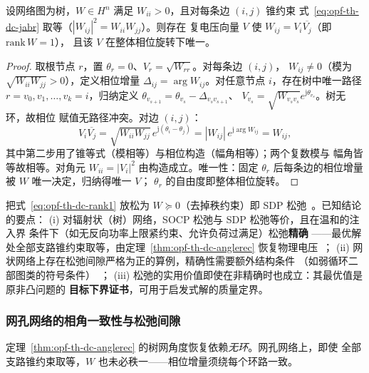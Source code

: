 \begin{theorem}[树网角度恢复]\label{thm:opf-th-dc-anglerec}
设网络图为树，$W\in H^n$ 满足 $W_{ii}>0$，且对每条边 $(i,j)$ 锥约束
式~\eqref{eq:opf-th-dc-jabr} 取等（$|W_{ij}|^2=W_{ii}W_{jj}$）。则存在
复电压向量 $V$ 使 $W_{ij}=V_i\overline{V_j}$（即 $\mathrm{rank}\,W=1$），
且该 $V$ 在整体相位旋转下唯一。
\end{theorem}

\begin{proof}
取根节点 $r$，置 $\theta_r=0$、$V_r=\sqrt{W_{rr}}$。对每条边 $(i,j)$，
$W_{ij}\neq0$（模为 $\sqrt{W_{ii}W_{jj}}>0$），定义相位增量
$\Delta_{ij}=\arg W_{ij}$。对任意节点 $i$，存在树中唯一路径
$r=v_0,v_1,\dots,v_k=i$，归纳定义
$\theta_{v_{s+1}}=\theta_{v_s}-\Delta_{v_s v_{s+1}}$、
$V_{v_s}=\sqrt{W_{v_sv_s}}e^{\mathrm j\theta_{v_s}}$。树无环，故相位
赋值无路径冲突。对边 $(i,j)$：
\begin{equation}
V_i\overline{V_j}=\sqrt{W_{ii}W_{jj}}\,
e^{\mathrm j(\theta_i-\theta_j)}
=|W_{ij}|\,e^{\mathrm j\arg W_{ij}}=W_{ij},
\end{equation}
其中第二步用了锥等式（模相等）与相位构造（幅角相等）；两个复数模与
幅角皆等故相等。对角元 $W_{ii}=|V_i|^2$ 由构造成立。唯一性：固定
$\theta_r$ 后每条边的相位增量被 $W$ 唯一决定，归纳得唯一 $V$；
$\theta_r$ 的自由度即整体相位旋转。
\end{proof}

\begin{remark}\label{rem:opf-th-dc-sdp}
把式~\eqref{eq:opf-th-dc-rank1} 放松为 $W\succeq0$（去掉秩约束）即
SDP 松弛~\cite{opfdc:lavaei-low,opfdc:low-tutorial}。已知结论的要点：
(i) 对辐射状（树）网络，SOCP 松弛与 SDP 松弛等价，且在温和的注入界
条件下（如无反向功率上限紧约束、允许负荷过满足）松弛\textbf{精确}
——最优解处全部支路锥约束取等，由定理~\ref{thm:opf-th-dc-anglerec}
恢复物理电压~\cite{opfdc:farivar-low,opfdc:gan-low}；
(ii) 网状网络上存在松弛间隙严格为正的算例，精确性需要额外结构条件
（如弱循环二部图类的符号条件）~\cite{opfdc:lavaei-low}；
(iii) 松弛的实用价值即使在非精确时也成立：其最优值是原非凸问题的
\textbf{目标下界证书}，可用于启发式解的质量定界。
\end{remark}

\subsubsection{网孔网络的相角一致性与松弛间隙}

定理~\ref{thm:opf-th-dc-anglerec} 的树网角度恢复依赖\emph{无环}。网孔网络上，即使
全部支路锥约束取等，$W$ 也未必秩一——相位增量须绕每个环路一致。


